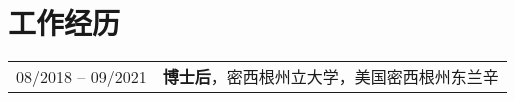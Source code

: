 \section*{工作经历}
\begin{tabular}{p{} p{}}
08/2018 -- 09/2021 & \textbf{博士后}，密西根州立大学，美国密西根州东兰辛 \\
\end{tabular}
